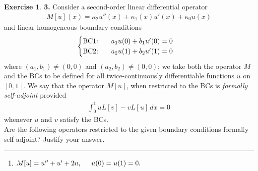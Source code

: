 \documentclass{book}
\theoremstyle{definition}
\newtheorem*{exer*}{Exercise}
\begin{document}
\newpage


\begin{exer*}\textbf{3. }
	Consider a second-order linear differential operator
	\begin{align*}
	M[u](x) = \kappa_2 u''(x) + \kappa_1(x)u'(x) + \kappa_0 u(x)
	\end{align*}
	and linear homogeneous boundary conditions 
	\begin{align*}
	\begin{cases}
	\text{BC1: }\hspace{0.5cm} a_1u(0) + b_1u'(0) = 0\\
	\text{BC2: }\hspace{0.5cm} a_2u(1) + b_2 u'(1) = 0
	\end{cases}
	\end{align*}
	where $(a_1,b_1) \neq (0,0)$ and $(a_2,b_2) \neq (0,0)$; we take both the operator $M$ and the BCs to be defined for all twice-continuously differentiable functions $u$ on $[0,1]$. We say that the operator $M[u]$, when restricted to the BCs is \textit{formally self-adjoint} provided
	\begin{align*}
	\int^1_0 uL[v] - vL[u]\,dx = 0
	\end{align*}
	whenever $u$ and $v$ satisfy the BCs. \\
	
	Are the following operators restricted to the given boundary conditions formally self-adjoint? Justify your
	answer.
	
	
	\noindent\rule{\textwidth}{0.5pt}
	
	\begin{enumerate}
		\item $M[u] = u''+ u' + 2u,\hspace{0.5cm} u(0) = u(1) = 0.$\\
		

\end{enumerate}
\end{exer*}
\end{document}
